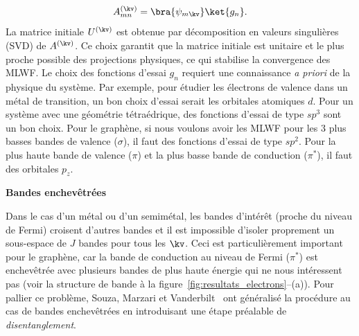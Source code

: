 \begin{equation}
    A^{(\kv)}_{mn} = \bra{\psi_{m\kv}}\ket{g_n}.
\end{equation}
La matrice initiale $U^{(\kv)}$ est obtenue par décomposition en valeurs singulières (SVD) de $A^{(\kv)}$. Ce choix garantit que la matrice initiale est unitaire et le plus proche possible des projections physiques, ce qui stabilise la convergence des MLWF. Le choix des fonctions d'essai $g_n$ requiert une connaissance \textit{a priori} de la physique du système. Par exemple, pour étudier les électrons de valence dans un métal de transition, un bon choix d'essai serait les orbitales atomiques $d$. Pour un système avec une géométrie tétraédrique, des fonctions d'essai de type $sp^3$ sont un bon choix. Pour le graphène, si nous voulons avoir les MLWF pour les 3 plus basses bandes de valence ($\sigma$), il faut des fonctions d'essai de type $sp^2$. Pour la plus haute bande de valence ($\pi$) et la plus basse bande de conduction ($\pi^*$), il faut des orbitales $p_z$. 

\noindent\textbf{Bandes enchevêtrées}

Dans le cas d'un métal ou d'un semimétal, les bandes d'intérêt (proche du niveau de Fermi) croisent d'autres bandes et il est impossible d'isoler proprement un sous-espace de $J$ bandes pour tous les $\kv$. Ceci est particulièrement important pour le graphène, car la bande de conduction au niveau de Fermi ($\pi^*$) est enchevêtrée avec plusieurs bandes de plus haute énergie qui ne nous intéressent pas (voir la structure de bande à la figure~\ref{fig:resultats_electrons}--(a)). Pour pallier ce problème, Souza, Marzari et Vanderbilt~\cite{souzaMaximallylocalizedWannierFunctions2001} ont généralisé la procédure au cas de bandes enchevêtrées en introduisant une étape préalable de \textit{disentanglement}.

